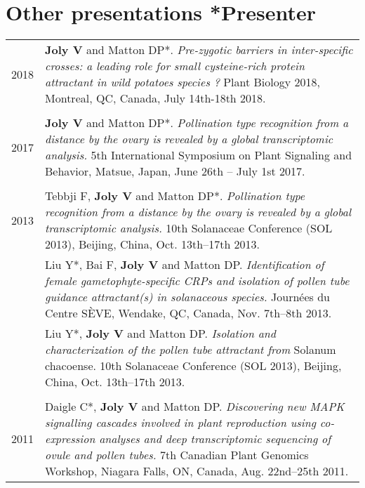 \documentclass[letterpaper,10pt]{article}
\begin{document}
\bigskip
\bigskip

\section[Other presentations]{Other presentations \hfill \small{*Presenter}}
\begin{tabular}{r|p{15.1cm}}

2018

& \textbf{Joly V} and Matton DP*.
  \emph{Pre-zygotic barriers in inter-specific crosses: a leading role for small
  cysteine-rich protein attractant in wild potatoes species ?}
  Plant Biology 2018, Montreal, QC, Canada, July 14th-18th 2018.
  \\

\multicolumn{2}{c}{} \\

2017

& \textbf{Joly V} and Matton DP*.
  \emph{Pollination type recognition from a distance by the ovary is revealed
  by a global transcriptomic analysis.}
  5th International Symposium on Plant Signaling and Behavior, Matsue, Japan,
  June 26th -- July 1st 2017.
  \\

\multicolumn{2}{c}{} \\

2013

& Tebbji F, \textbf{Joly V} and Matton DP*. \emph{Pollination type recognition
  from a distance by the ovary is revealed by a global transcriptomic analysis.}
  10th Solanaceae Conference (SOL 2013), Beijing, China, Oct. 13th--17th 2013.
  \vspace{1.5mm} \\

& Liu Y*, Bai F, \textbf{Joly V} and Matton DP.
  \emph{Identification of female gametophyte-specific CRPs and isolation of
  pollen tube guidance attractant(s) in solanaceous species.}
  Journées du Centre SÈVE, Wendake, QC, Canada, Nov. 7th--8th 2013.
  \vspace{1.5mm} \\

& Liu Y*, \textbf{Joly V} and Matton DP.
  \emph{Isolation and characterization of the pollen tube attractant from}
  Solanum chacoense. 10th Solanaceae Conference (SOL 2013), Beijing, China,
  Oct. 13th--17th 2013.
  \vspace{1.5mm} \\

\multicolumn{2}{c}{} \\

2011

& Daigle C*, \textbf{Joly V} and Matton DP.
  \emph{Discovering new MAPK signalling cascades involved in plant reproduction
  using co-expression analyses and deep transcriptomic sequencing of ovule
  and pollen tubes.}
  7th Canadian Plant Genomics Workshop, Niagara Falls, ON, Canada,
  Aug. 22nd--25th 2011.
  \\

\end{tabular}
\end{document}
